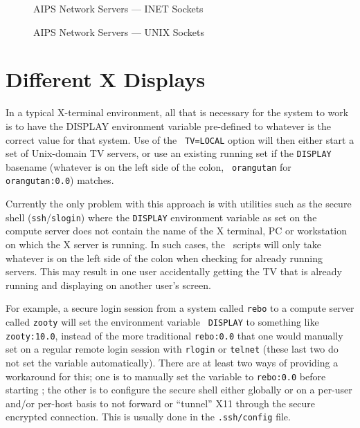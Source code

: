
\begin{figure}
\caption{AIPS Network Servers --- INET Sockets}
\vskip 1cm %
\epsfysize=7in
\end{figure}

\begin{figure}
\caption{AIPS Network Servers --- UNIX Sockets}
\vskip 1cm %
\epsfysize=7in
\end{figure}

\section{Different X Displays}

In a typical X-terminal environment, all that is necessary for the
system to work is to have the DISPLAY environment variable pre-defined
to whatever is the correct value for that system.  Use of the {\tt
TV=LOCAL} option will then either start a set of Unix-domain TV servers,
or use an existing running set if the {\tt DISPLAY} basename (whatever
is on the left side of the colon, \eg\  {\tt orangutan} for {\tt
orangutan:0.0}) matches.

Currently the only problem with this approach is with utilities such as
the secure shell ({\tt ssh}/{\tt slogin}) where the {\tt DISPLAY}
environment variable as set on the compute server does not contain the
name of the X terminal, PC or workstation on which the X server is
running.  In such cases, the \AIPS\ scripts will only take whatever is
on the left side of the colon when checking for already running servers.
This may result in one user accidentally getting the TV that is already
running and displaying on another user's screen.

For example, a secure login session from a system called {\tt rebo} to a
compute server called {\tt zooty} will set the environment variable {\tt
DISPLAY} to something like {\tt zooty:10.0}, instead of the more
traditional {\tt rebo:0.0} that one would manually set on a regular
remote login session with {\tt rlogin} or {\tt telnet} (these last two
do not set the variable automatically).  There are at least two ways of
providing a workaround for this; one is to manually set the variable to
{\tt rebo:0.0} before starting \ttaips; the other is to configure the
secure shell either globally or on a per-user and/or per-host basis to
not forward or ``tunnel'' X11 through the secure encrypted connection.
This is usually done in the {\tt .ssh/config} file.

